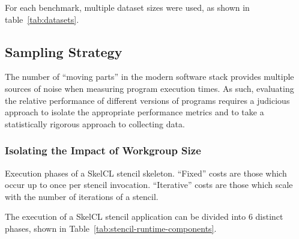 For each benchmark, multiple dataset sizes were used, as shown in
table~\ref{tab:datasets}.

\begin{table}

\caption{%
  Datasets used.%
}
\label{tab:datasets}
\end{table}


\subsection{Sampling Strategy}\label{sec:sampling}

The number of ``moving parts'' in the modern software stack provides
multiple sources of noise when measuring program execution times. As
such, evaluating the relative performance of different versions of
programs requires a judicious approach to isolate the appropriate
performance metrics and to take a statistically rigorous approach to
collecting data.

\subsubsection{Isolating the Impact of Workgroup Size}

\begin{table}

\caption{Execution phases of a SkelCL stencil skeleton. ``Fixed''
  costs are those which occur up to once per stencil
  invocation. ``Iterative'' costs are those which scale with the
  number of iterations of a stencil.}
\label{tab:stencil-runtime-components}
\end{table}

The execution of a SkelCL stencil application can be divided into 6
distinct phases, shown in Table~\ref{tab:stencil-runtime-components}.


